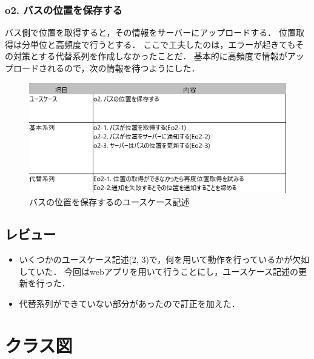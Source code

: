 \documentclass[documentclass]{jsarticle}
\begin{document}
\subsubsection*{o2. バスの位置を保存する}
バス側で位置を取得すると，その情報をサーバーにアップロードする．
位置取得は分単位と高頻度で行うとする．
ここで工夫したのは，エラーが起きてもその対策とする代替系列を作成しなかったことだ．
基本的に高頻度で情報がアップロードされるので，次の情報を待つようにした．

\begin{figure}[H]
  \begin{center}
    \includegraphics*[scale=0.6]{figure/4-8.png}
  \end{center}
  \caption{バスの位置を保存するのユースケース記述}
  \label{fig:4-8}
\end{figure}

\subsection*{レビュー}
\begin{itemize}
  \item いくつかのユースケース記述(2, 3)で，何を用いて動作を行っているかが欠如していた．
  今回はwebアプリを用いて行うことにし，ユースケース記述の更新を行った．
  \item 代替系列ができていない部分があったので訂正を加えた．
\end{itemize}

\newpage

\section{クラス図}
\end{document}
